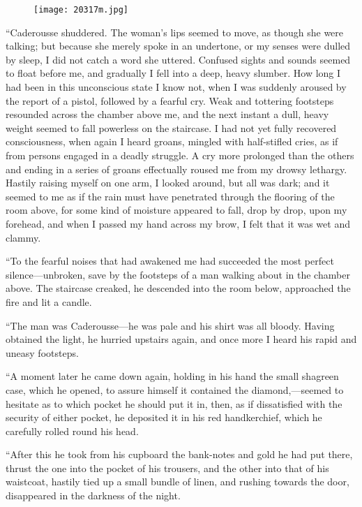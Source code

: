 \begin{figure}[ht]
\texttt{[image: 20317m.jpg]}
\end{figure}

“Caderousse shuddered. The woman’s lips seemed to move, as though she
were talking; but because she merely spoke in an undertone, or my
senses were dulled by sleep, I did not catch a word she uttered.
Confused sights and sounds seemed to float before me, and gradually I
fell into a deep, heavy slumber. How long I had been in this
unconscious state I know not, when I was suddenly aroused by the report
of a pistol, followed by a fearful cry. Weak and tottering footsteps
resounded across the chamber above me, and the next instant a dull,
heavy weight seemed to fall powerless on the staircase. I had not yet
fully recovered consciousness, when again I heard groans, mingled with
half-stifled cries, as if from persons engaged in a deadly struggle. A
cry more prolonged than the others and ending in a series of groans
effectually roused me from my drowsy lethargy. Hastily raising myself
on one arm, I looked around, but all was dark; and it seemed to me as
if the rain must have penetrated through the flooring of the room
above, for some kind of moisture appeared to fall, drop by drop, upon
my forehead, and when I passed my hand across my brow, I felt that it
was wet and clammy.

“To the fearful noises that had awakened me had succeeded the most
perfect silence—unbroken, save by the footsteps of a man walking about
in the chamber above. The staircase creaked, he descended into the room
below, approached the fire and lit a candle.

“The man was Caderousse—he was pale and his shirt was all bloody.
Having obtained the light, he hurried upstairs again, and once more I
heard his rapid and uneasy footsteps.

“A moment later he came down again, holding in his hand the small
shagreen case, which he opened, to assure himself it contained the
diamond,—seemed to hesitate as to which pocket he should put it in,
then, as if dissatisfied with the security of either pocket, he
deposited it in his red handkerchief, which he carefully rolled round
his head.

“After this he took from his cupboard the bank-notes and gold he had
put there, thrust the one into the pocket of his trousers, and the
other into that of his waistcoat, hastily tied up a small bundle of
linen, and rushing towards the door, disappeared in the darkness of the
night.


